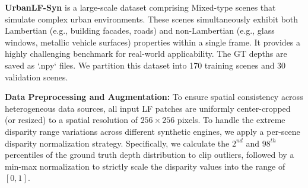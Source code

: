 \documentclass[lettersize,journal]{IEEEtran}
\begin{document}
\textbf{UrbanLF-Syn} is a large-scale dataset comprising Mixed-type scenes that simulate complex urban environments. These scenes simultaneously exhibit both Lambertian (e.g., building facades, roads) and non-Lambertian (e.g., glass windows, metallic vehicle surfaces) properties within a single frame. It provides a highly challenging benchmark for real-world applicability. The GT depths are saved as `.npy` files. We partition this dataset into 170 training scenes and 30 validation scenes.

\begin{table}[htbp]
  \centering
  \caption{Statistics and characteristics of the Light Field datasets used in our experiments.}
  \label{tab:datasets}
\end{table}

\textbf{Data Preprocessing and Augmentation:} 
To ensure spatial consistency across heterogeneous data sources, all input LF patches are uniformly center-cropped (or resized) to a spatial resolution of $256 \times 256$ pixels. To handle the extreme disparity range variations across different synthetic engines, we apply a per-scene disparity normalization strategy. Specifically, we calculate the $2^{nd}$ and $98^{th}$ percentiles of the ground truth depth distribution to clip outliers, followed by a min-max normalization to strictly scale the disparity values into the range of $[0, 1]$.
\end{document}
